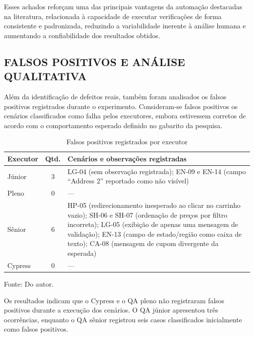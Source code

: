 \documentclass{UNESC}
\begin{document}
Esses achados reforçam uma das principais vantagens da automação destacadas na literatura, relacionada à capacidade de executar verificações de forma consistente e padronizada, reduzindo a variabilidade inerente à análise humana e aumentando a confiabilidade dos resultados obtidos.

\subsection{FALSOS POSITIVOS E ANÁLISE QUALITATIVA}

Além da identificação de defeitos reais, também foram analisados os falsos positivos registrados durante o experimento. Consideram-se falsos positivos os cenários classificados como falha pelos executores, embora estivessem corretos de acordo com o comportamento esperado definido no gabarito da pesquisa.

\begin{table}[H]
\captionsetup{skip=2pt, singlelinecheck=false, justification=centering}
\caption{Falsos positivos registrados por executor}
\label{tab:falsos_positivos}
\renewcommand{\arraystretch}{1.0}
\setlength{\extrarowheight}{4pt}
\setlength{\tabcolsep}{6pt}
\begin{tabularx}{\textwidth}{l c X}
\hline
\textbf{Executor} & \textbf{Qtd.} & \textbf{Cenários e observações registradas} \\
\hline
Júnior  & 3 & LG-04 (sem observação registrada); EN-09 e EN-14 (campo ``Address 2'' reportado como não visível) \\
Pleno   & 0 & --- \\
Sênior  & 6 & HP-05 (redirecionamento inesperado ao clicar no carrinho vazio); SH-06 e SH-07 (ordenação de preços por filtro incorreta); LG-05 (exibição de apenas uma mensagem de validação); EN-13 (campo de estado/região como caixa de texto); CA-08 (mensagem de cupom divergente da esperada) \\
Cypress & 0 & --- \\
\hline
\end{tabularx}
\vspace{2mm}\par
\noindent Fonte: Do autor.
\end{table}

Os resultados indicam que o Cypress e o QA pleno não registraram falsos positivos durante a execução dos cenários. O QA júnior apresentou três ocorrências, enquanto o QA sênior registrou seis casos classificados inicialmente como falsos positivos.
\end{document}
